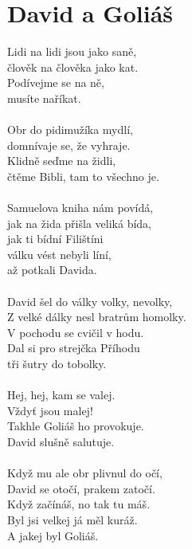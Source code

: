 \section{David a Goliáš}
Lidi na lidi jsou jako saně,\\
člověk na člověka jako kat.\\
Podívejme se na ně,\\
musíte naříkat.\\
\\
Obr do pidimužíka mydlí,\\
domnívaje se, že vyhraje.\\
Klidně seďme na židli,\\
čtěme Bibli, tam to všechno je.\\
\\
Samuelova kniha nám povídá,\\
jak na žida přišla veliká bída,\\
jak ti bídní Filištíni \\
válku vést nebyli líní,\\
až potkali Davida.\\
\\
David šel do války volky, nevolky,\\
Z velké dálky nesl bratrům homolky.\\
V pochodu se cvičil v hodu.\\
Dal si pro strejčka Příhodu\\
tři šutry do tobolky.\\
\\
Hej, hej, kam se valej.\\
Vždyť jsou malej!\\
Takhle Goliáš ho provokuje.\\
David slušně salutuje.\\
\\
Když mu ale obr plivnul do očí,\\
David se otočí, prakem zatočí.\\
Když začínáš, no tak tu máš.\\
Byl jsi velkej já měl kuráž.\\
A jakej byl Goliáš.\\
